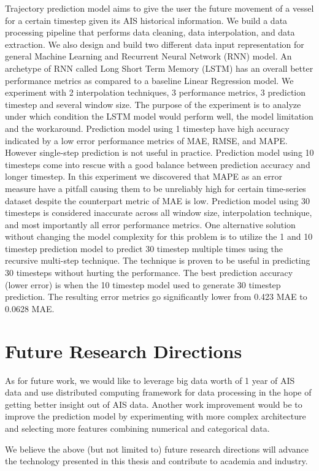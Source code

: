 Trajectory prediction model aims to give the user the future movement of a vessel for a certain timestep given its AIS historical information. We build a data processing pipeline that performs data cleaning, data interpolation, and data extraction. We also design and build two different data input representation for general Machine Learning and Recurrent Neural Network (RNN) model. An archetype of RNN called Long Short Term Memory (LSTM) has an overall better performance metrics as compared to a baseline Linear Regression model. We experiment with 2 interpolation techniques, 3 performance metrics, 3 prediction timestep and several window size. The purpose of the experiment is to analyze under which condition the LSTM model would perform well, the model limitation and the workaround. Prediction model using 1 timestep have high accuracy indicated by a low error performance metrics of MAE, RMSE, and MAPE. However single-step prediction is not useful in practice. Prediction model using 10 timesteps come into rescue with a good balance between prediction accuracy and longer timestep. In this experiment we discovered that MAPE as an error measure have a pitfall causing them to be unreliably high for certain time-series dataset despite the counterpart metric of MAE is low. Prediction model using 30 timesteps is considered inaccurate across all window size, interpolation technique, and most importantly all error performance metrics. One alternative solution without changing the model complexity for this problem is to utilize the 1 and 10 timestep prediction model to predict 30 timestep multiple times using the recursive multi-step technique. The technique is proven to be useful in predicting 30 timesteps without hurting the performance. The best prediction accuracy (lower error) is when the 10 timestep model used to generate 30 timestep prediction. The resulting error metrics go significantly lower from 0.423 MAE to 0.0628 MAE.

\section{Future Research Directions}
As for future work, we would like to leverage big data worth of 1 year of AIS data and use distributed computing framework for data processing in the hope of getting better insight out of AIS data. Another work improvement would be to improve the prediction model by experimenting with more complex architecture and selecting more features combining numerical and categorical data.

We believe the above (but not limited to) future research directions will advance the technology presented in this thesis and contribute to academia and industry.
